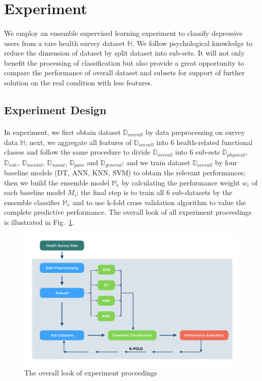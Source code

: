 \documentclass[runningheads]{llncs}
\begin{document}
\section{Experiment}
%
\paragraph{}
We employ an ensemble supervised learning experiment to classify depressive users from a rare health survey dataset $\mathbb{H}$. We follow psychological knowledge to reduce the dimension of dataset by split dataset into sub-sets. It will not only benefit the processing of classification but also provide a great opportunity to compare the performance of overall dataset and subsets for support of further solution on the real condition with less features.
%
\subsection{Experiment Design}
%
\paragraph{}
In experiment, we first obtain dataset $\mathbb{D}_{overall}$ by data preprocessing on survey data $\mathbb{H}$; next, we aggregate all features of $\mathbb{D}_{overall}$ into 6 health-related functional classes and follow the same procedure to divide $\mathbb{D}_{overall}$ into 6 sub-sets $\mathbb{D}_{physical}$, $\mathbb{D}_{role}$, $\mathbb{D}_{mental}$, $\mathbb{D}_{social}$, $\mathbb{D}_{pain}$ and $\mathbb{D}_{general}$; and we train dataset $\mathbb{D}_{overall}$ by four baseline models (DT, ANN, KNN, SVM) to obtain the relevant performances; then we build the ensemble model $\mathbb{M}_{e}$ by calculating the performance weight $w_{i}$ of each baseline model $M_{i} $; the final step is to train all 6 sub-datasets by the ensemble classifier $\mathbb{M}_{e}$ and to use k-fold cross validation algorithm to value the complete predictive performance. The overall look of all experiment proceedings is illustrated in Fig.~\ref{fig4}. 
\begin{figure}[h]
\includegraphics[width=1\textwidth]{experiment.png}
\caption{The overall look of experiment proceedings} \label{fig4}
\end{figure}
%
\end{document}
